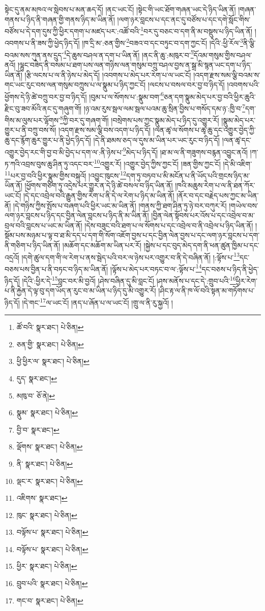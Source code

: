 སྟེང་དུ་ནམ་མཁའ་ལ་སླེབས་པ་མན་ཆད་དོ། །ནང་ཡང་ངོ། །སྟེང་གི་ཡང་ཐོག་གཞན་ཡང་དེ་ཉིད་ཡིན་ནོ། །གཞན་གནས་པ་ཉིད་ནི་གཞན་གྱི་གནས་ཉིད་མ་ཡིན་ནོ། །ལག་ཉར་བླངས་པ་དང་ནང་དུ་བཙོས་པ་དང་དགེ་སློང་གིས་བཙོས་པ་དེ་དག་དུས་ཀྱི་ཕྱིར་དགག་པ་མཛད་པར་:འཚོ་བའི་\footnote{ཚོ་བའི་  སྣར་ཐང་།  པེ་ཅིན། }བར་དུ་བཅང་བ་དག་ནི་མ་བསྡུས་པ་ཉིད་ཡིན་ནོ། །འབགས་པ་ནི་ཟས་ཀྱི་ཕྱེད་ཉིད་དོ། །ཁ་དྲི་མ་:ཅན་གྱིས་\footnote{ཅན་གྱི་  སྣར་ཐང་།  པེ་ཅིན། }བཟའ་བ་དང་བཏུང་བ་དག་ཀྱང་ངོ། །དེའི་:ཕྱི་རོལ་\footnote{ཕྱི་ཕྱིར་ལ་  སྣར་ཐང་།  པེ་ཅིན། }ནི་ལྕི་བའམ་སས་ཀུན་ནས་དྲུད་\footnote{དུད་  སྣར་ཐང་། }དེ་ཆུས་བཤལ་ན་དག་པ་ཡིན་ནོ། །ནང་ནི་ཆུ་:མཁུར་བ་\footnote{མཁུ་བ་  ཅོ་ནེ། }དོའམ་གསུམ་གྱིས་བཤལ་ནའོ། །ལྷུང་བཟེད་ནི་བསམ་པ་ཐག་པས་ལན་གཉིས་ལན་གསུམ་བཀྲུ་བཤལ་བྱས་ན་སྒྲ་མི་སྙན་ཡང་དག་པ་ཉིད་ཡིན་ནོ། །རྩི་ལངས་པ་ལ་ནི་ཉེས་པ་མེད་དོ། །འབགས་པ་མེད་པར་རེག་པ་ལ་ཡང་ངོ། །འདག་རྫས་སམ་ལྕི་བའམ་ས་གང་ཡང་རུང་བས་ལན་གསུམ་བཀྲུས་པ་ལ་སྣུམ་པ་ཉིད་ཀྱང་ངོ། །ལངས་པ་བསལ་བར་བྱ་བ་ཉིད་དོ། །འབགས་པའི་ཕྱོགས་དེ་ཉི་ཚེ་བཀྲུ་བར་བྱ་བ་ཉིད་དོ། །བུམ་པ་ལ་སོགས་པ་:སྣུམ་བག་\footnote{སྣུམ་  སྣར་ཐང་།  པེ་ཅིན། }ཅན་དག་སྣུམ་མེད་པར་བྱ་བའི་ཕྱིར་ཆུའི་རྫིང་བུ་ཟབ་མོའི་ནང་དུ་གཞུག་གོ། །ཉ་འམ་རུས་སྦལ་ལམ་སྦལ་པའམ་ཆུ་སྲིན་བྱིས་པ་གསོད་དམ་ཉ་:ཁྱི་བ་\footnote{བྱི་བ་  སྣར་ཐང་། }དག་གིས་མ་ལུས་པར་ལྷོགས་\footnote{ལྡོགས་  སྣར་ཐང་།  པེ་ཅིན། }ཀྱི་བར་དུ་གཞག་གོ། །བསྲེགས་པས་ཀྱང་སྣུམ་མེད་པ་ཉིད་དུ་འགྱུར་རོ། །སྣུམ་མེད་པར་གྱུར་པ་ནི་བཀྲུ་བས་སོ། །འདག་རྫས་སམ་ལྕི་བས་འདག་པ་ཉིད་དོ། །ལན་ཚྭ་ལ་སོགས་པ་ཚྭ་ཆུ་དང་འགྱུར་བྱེད་ཀྱི་ཆུ་དང་རྙོག་ཆུར་གྱུར་པ་ནི་ཕྱེད་ཉིད་དོ། །དེ་ནི་ཐམས་ཅད་ལ་དུས་མ་ཡིན་པར་ཡང་རུང་བ་ཉིད་དོ། །ལན་ཚྭ་དང་འགྱུར་བྱེད་རང་གི་བྱ་བ་མི་བྱེད་པ་དག་ལ་:ནི་ཉེས་པ་\footnote{ནི་  སྣར་ཐང་།  པེ་ཅིན། }མེད་པ་ཉིད་དོ། །ཐ་མ་ལ་ནི་གཟུགས་བརྙན་འབྱུང་ནའོ། །ཀ་ཏ་ཀའི་འབྲས་བུས་ཆུ་ཤིན་ཏུ་འདང་བར་\footnote{ལྡང་ར་  སྣར་ཐང་།  པེ་ཅིན། }འགྱུར་རོ། །འགྱུར་བྱེད་ཀྱིས་ཀྱང་ངོ། །ཟན་གྱིས་ཀྱང་ངོ། །དེ་མི་འཇིག་\footnote{འཇིགས་  སྣར་ཐང་། }པར་བྱ་བའི་ཕྱིར་སྣུམ་གྱིས་བསྐུའོ། །འབྱུང་ཁུངས་\footnote{ཁུང་  སྣར་ཐང་།  པེ་ཅིན། }དག་ཏུ་བཏབ་པ་མི་མངོན་པ་ནི་ཡོད་པའི་གྲངས་ཉིད་མ་ཡིན་ནོ། །ཕྱོགས་གཅིག་ཏུ་འདྲེས་པར་གྱུར་ན་དེ་ཉི་ཚེ་བསལ་བ་ཉིད་ཡིན་ནོ། །ཁའི་མཆུས་རེག་པ་ལ་ནི་ཐན་ཀོར་ཡང་ངོ། །དེ་དང་འབྲེལ་བའི་རྒྱུན་གྱིས་རེག་པ་ནི་དེ་ལ་རེག་པ་ཉིད་མ་ཡིན་ནོ། །ནོར་བ་དང་བརྗེད་པས་ཀྱང་མ་ཡིན་ནོ། །དེ་གཉིས་ཀྱིས་སྤོས་པ་བཞག་པའི་ཕྱིར་ཡང་མ་ཡིན་ནོ། །གནས་ཀྱི་ཐག་ཤིན་ཏུ་ཉེ་བར་བཀུར་རོ། །གཡེལ་བས་ལག་ཉར་བླངས་པ་ཉིད་དང་བྱིན་ལེན་བླངས་པ་ཉིད་ནི་མ་ཡིན་ནོ། །བྱིན་ལེན་སྟོབས་པར་འོས་པ་དང་འབྲེལ་བ་མ་བྲལ་བའི་བླངས་པ་ཡང་མ་ཡིན་ནོ། །དེས་བཟུང་བའི་ཐག་པ་ལ་སོགས་པ་དང་འབྲེལ་བ་ནི་འབྲེལ་པ་ཉིད་ཡིན་ནོ། །སྡོམ་པས་མཉམ་པ་ལྟ་བ་ཐ་མི་དད་པ་དག་གི་སོག་འཇོག་བྱས་པ་དང་བྱིན་ལེན་བྱས་པ་དང་ལག་ཉར་བླངས་པ་དག་ནི་གཅིག་པ་ཉིད་ཡིན་ནོ། །མཆོག་དང་མཆོག་མ་ཡིན་པར་རོ། །སྐྱེས་པ་དང་བུད་མེད་དག་ནི་ཕན་ཚུན་ཁྱིམ་པ་དང་འདྲའོ། །དགེ་ཚུལ་དག་གི་ལ་རེག་པ་ནས་སྦེད་པའི་བར་ལ་ཉེས་པར་འགྱུར་བ་ནི་དེ་བཞིན་ནོ། །:ལྟོས་པ་\footnote{བལྟོས་པ་  སྣར་ཐང་།  པེ་ཅིན། }དང་བཅས་པས་བྱིན་པ་ནི་བཏང་བ་ཉིད་མ་ཡིན་ནོ། །ལྟོས་པ་མེད་པར་བཏང་བ་ལ་:ལྟོས་པ་\footnote{བལྟོས་པ་  སྣར་ཐང་།  པེ་ཅིན། }དང་བཅས་པ་ཉིད་ནི་ཕྱེད་ཉིད་དོ། །དེའི་:ཕྱིར་དེ་\footnote{ཕྱིར་  སྣར་ཐང་།  པེ་ཅིན། }བླང་བར་མི་བྱའོ། །ཤེས་བཞིན་དུ་མི་བླང་ངོ། །ཤས་མནོས་པ་དང་དེ་:གྲུབ་པའི་\footnote{བྲུབ་པའི་  སྣར་ཐང་།  པེ་ཅིན། }ཕྱིར་རེག་པ་ནི་རྐྱེན་དེ་ལྟ་བུ་དག་ཡོད་ན་རུང་བ་མ་ཡིན་པ་ཉིད་དུ་མི་འགྱུར་རོ། །ཤིང་རྟ་ལ་ནི་ཁ་ལོ་བའི་སྟན་མ་གཏོགས་པ་ཉིད་དོ། །དེ་གང་\footnote{གང་བ་  སྣར་ཐང་།  པེ་ཅིན། }ལ་ཡང་ངོ། །ནད་པ་ཞོན་པ་ལ་ཡང་ངོ། །གྲུ་ལ་ནི་རུ་སྐྱའོ། །
